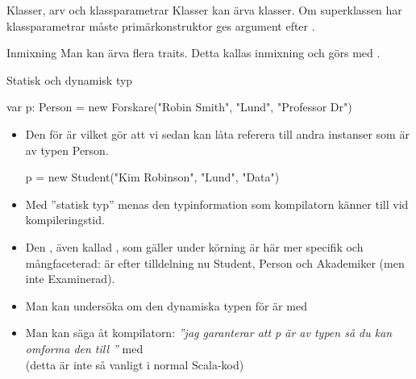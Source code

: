 \begin{Slide}{Klasser, arv och klassparametrar}\SlideFontTiny
Klasser kan ärva klasser. Om superklassen har klassparametrar måste primärkonstruktor ges argument efter .


\end{Slide}


\begin{Slide}{Inmixning}\SlideFontTiny
Man kan ärva flera traits. Detta kallas inmixning  och görs med .
\end{Slide}


\begin{Slide}{Statisk och dynamisk typ}\SlideFontSmall
\begin{Code}
    var p: Person = new Forskare("Robin Smith", "Lund", "Professor Dr")
\end{Code}
\begin{itemize}
\item Den  för  är  vilket gör att vi sedan kan låta  referera till andra instanser som är av typen Person.
\begin{Code}
p = new Student("Kim Robinson", "Lund", "Data")
\end{Code}

\pause

\item Med ''statisk typ'' menas den typinformation som kompilatorn känner till vid kompileringstid.

\pause
\item Den , även kallad , som gäller under körning är här mer specifik och mångfaceterad:  är efter tilldelning nu Student, Person och Akademiker (men inte Examinerad).

\pause

\item Man kan undersöka om den dynamiska typen för  är  med  

\pause

\item Man kan säga åt kompilatorn: \emph{''jag garanterar att p är av typen  så du kan omforma den till ''} med   \\ \pause (detta är inte så vanligt i normal Scala-kod)
\end{itemize}
\end{Slide}


